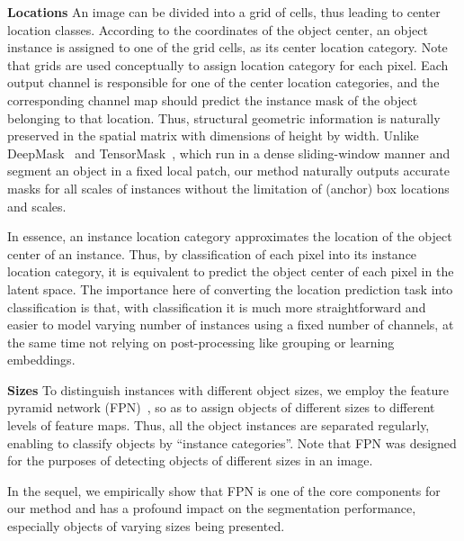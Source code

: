 \documentclass[runningheads]{llncs}
\begin{document}
\textbf{Locations}
An image can be divided into a grid of  cells, thus leading to  center location classes. According to the coordinates of the object center, an object instance is assigned to one of the grid cells, as its center location category.
Note that grids are used conceptually to assign location category for each pixel.
Each output channel is responsible for one of the center location categories, and the corresponding channel map should predict the instance mask of the object belonging to that location.
Thus,
structural geometric information is naturally preserved in the spatial matrix with dimensions of height by width.
Unlike DeepMask~\cite{deepmask} and TensorMask~\cite{Chen_2019_ICCV}, which run in a dense sliding-window manner and segment an object in a fixed local patch, our method
naturally outputs accurate masks for all scales of instances without the limitation of (anchor) box locations and scales.

In essence, an instance location category approximates
the location of the object center of an instance.
Thus, by classification of each pixel into its instance location category, it is equivalent to predict the object center of each pixel in the latent space.
The importance here of converting
the location prediction task into classification
is that, with
classification it is much
more straightforward and easier to model
varying number of instances using a fixed number of channels, at the same time not relying on post-processing like grouping or learning embeddings.





\textbf{Sizes}
To distinguish instances with different object sizes,
we employ the feature pyramid network
(FPN)~\cite{fpn}, so as to
assign objects of
different sizes to different levels of feature maps.
Thus, all the object instances are separated regularly, enabling to classify objects by ``instance categories''.
Note that FPN was designed for the purposes of detecting objects of different sizes
in an image.




In the sequel, we empirically show that FPN is one of the core components for our method and has a profound impact on the segmentation performance, especially objects of varying sizes being presented.
\end{document}
